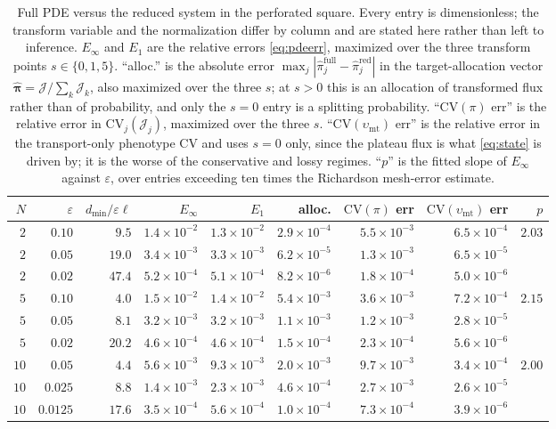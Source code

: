 \documentclass[pdflatex,sn-mathphys-num]{sn-jnl}
\numberwithin{equation}{section}
\theoremstyle{thmstyleone}%
\theoremstyle{definition}
\theoremstyle{remark}
\newcommand{\e}[1]{{\times}10^{#1}}
\begin{document}
\begin{table}[htbp]\centering\small
\caption{Full PDE versus the reduced system in the perforated square. Every
entry is dimensionless; the transform variable and the normalization differ by
column and are stated here rather than left to inference.
$E_\infty$ and $E_1$ are the relative errors \eqref{eq:pdeerr},
maximized over the three transform points $s\in\{0,1,5\}$.
``alloc.'' is the absolute error
$\max_j|\widehat\pi^{\mathrm{full}}_j-\widehat\pi^{\mathrm{red}}_j|$ in the
target-allocation vector $\widehat{\bm\pi}=\bm{\mathcal J}/\sum_k\mathcal J_k$,
also maximized over the three $s$; at $s>0$ this is an allocation of transformed
flux rather than of probability, and only the $s=0$ entry is a splitting
probability.
``$\mathrm{CV}(\pi)$ err'' is the relative error in
$\mathrm{CV}_j(\mathcal J_j)$, maximized over the three $s$.
``$\mathrm{CV}(\upsilon_{\mathrm{mt}})$ err'' is the relative error in the
transport-only phenotype CV and uses $s=0$ only, since the plateau flux
is what \eqref{eq:state} is driven by; it is the worse of the conservative and
lossy regimes.
``$p$'' is the fitted slope of $E_\infty$ against $\varepsilon$, over entries
exceeding ten times the Richardson mesh-error estimate.}
\label{tab:multiverify}
\begin{tabular}{@{}rrr|rr|rrr|r@{}}
\toprule
$N$&$\varepsilon$&$d_{\min}/\varepsilon\ell$&$E_\infty$&$E_1$&
alloc.&$\mathrm{CV}(\pi)$ err&$\mathrm{CV}(\upsilon_{\mathrm{mt}})$ err&$p$\\
\midrule
$2$&$0.10$&$9.5$&$1.4\e{-2}$&$1.3\e{-2}$&$2.9\e{-4}$&$5.5\e{-3}$&$6.5\e{-4}$&$2.03$\\
$2$&$0.05$&$19.0$&$3.4\e{-3}$&$3.3\e{-3}$&$6.2\e{-5}$&$1.3\e{-3}$&$6.5\e{-5}$&\\
$2$&$0.02$&$47.4$&$5.2\e{-4}$&$5.1\e{-4}$&$8.2\e{-6}$&$1.8\e{-4}$&$5.0\e{-6}$&\\
\midrule
$5$&$0.10$&$4.0$&$1.5\e{-2}$&$1.4\e{-2}$&$5.4\e{-3}$&$3.6\e{-3}$&$7.2\e{-4}$&$2.15$\\
$5$&$0.05$&$8.1$&$3.2\e{-3}$&$3.2\e{-3}$&$1.1\e{-3}$&$1.2\e{-3}$&$2.8\e{-5}$&\\
$5$&$0.02$&$20.2$&$4.6\e{-4}$&$4.6\e{-4}$&$1.5\e{-4}$&$2.3\e{-4}$&$5.6\e{-6}$&\\
\midrule
$10$&$0.05$&$4.4$&$5.6\e{-3}$&$9.3\e{-3}$&$2.0\e{-3}$&$9.7\e{-3}$&$3.4\e{-4}$&$2.00$\\
$10$&$0.025$&$8.8$&$1.4\e{-3}$&$2.3\e{-3}$&$4.6\e{-4}$&$2.7\e{-3}$&$2.6\e{-5}$&\\
$10$&$0.0125$&$17.6$&$3.5\e{-4}$&$5.6\e{-4}$&$1.0\e{-4}$&$7.3\e{-4}$&$3.9\e{-6}$&\\
\bottomrule
\end{tabular}
\end{table}
\end{document}
